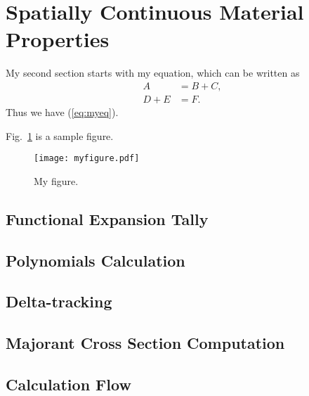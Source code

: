 \documentclass[11pt,a4paper,onecolumn,oneside]{report}
\begin{document}
\newpage 
\section{Spatially Continuous Material Properties} 

My second section starts with my equation, which can be written as 
%
\begin{equation}\label{eq:myeq}
\begin{split}
	A 		&= B + C, \\
    D + E	&= F.
\end{split}
\end{equation}
Thus we have (\ref{eq:myeq}).

Fig.~\ref{fig:myfigure} is a sample figure. 

\begin{figure}[h]
\centering
\texttt{[image: myfigure.pdf]}
\caption{My figure.} \label{fig:myfigure}
\end{figure}


\subsection{Functional Expansion Tally}
\subsection{Polynomials Calculation}
\subsection{Delta-tracking}
\subsection{Majorant Cross Section Computation}
\subsection{Calculation Flow}


\newpage 
\end{document}
